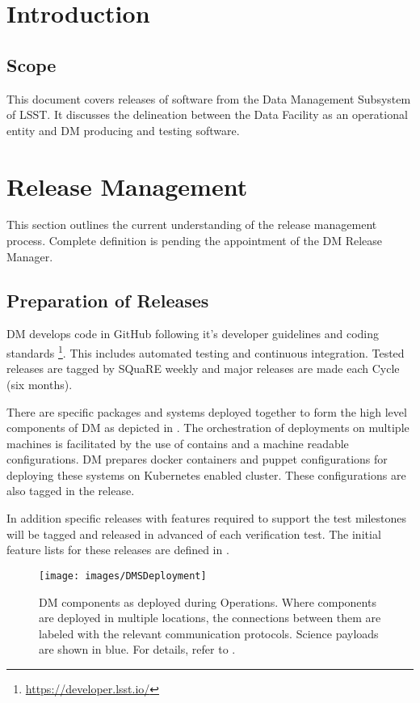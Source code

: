 \section{Introduction}
\subsection{Scope}

This document covers releases of software from the Data Management Subsystem of LSST.
It discusses the delineation between the Data Facility as an operational entity and DM producing and testing software.

\section{Release Management}\label{sect:relman}

This section outlines the current understanding of the release management process.
Complete definition is pending the appointment of the DM Release Manager.

\subsection{Preparation of Releases}\label{sect:relprep}

DM develops code in GitHub following it's developer guidelines and coding standards \footnote{\url{https://developer.lsst.io/}}.
This includes automated testing and continuous integration.
Tested releases are tagged by SQuaRE weekly and major releases are made each Cycle (six months).

There are specific packages and systems deployed together to form the high level components of DM as depicted in . The orchestration of deployments on multiple machines is facilitated by the use of contains and a machine readable configurations. DM prepares docker containers and puppet configurations for deploying these systems on Kubernetes enabled cluster. These configurations are also tagged in the release.

In addition specific releases with features required to support the \cite{LDM-503} test milestones will be tagged and released in advanced of each verification test. The initial feature lists for these releases are defined in .




\begin{figure}[htbp]
        \begin{center}
                \texttt{[image: images/DMSDeployment]}
                \caption{DM components as deployed during Operations. Where components are
                        deployed in multiple locations, the connections between them are labeled with
                        the relevant communication protocols. Science payloads are shown in blue.
            For details, refer to .
                \label{fig:dmsdeploy}}
        \end{center}
\end{figure}


